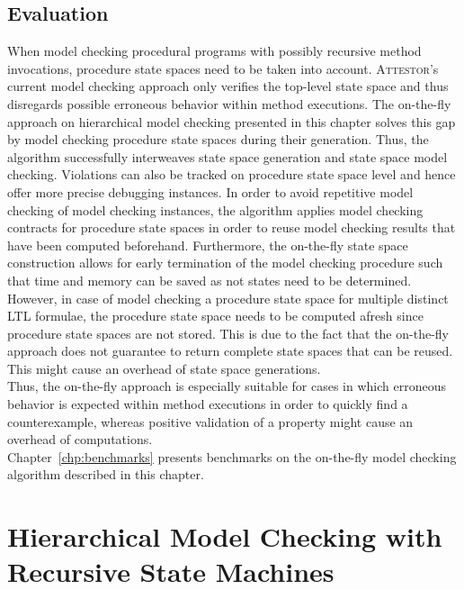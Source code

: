 \documentclass[a4paper, 12pt, twoside]{report}
\begin{document}
	
	\section{Evaluation}
	
	When model checking procedural programs with possibly recursive method invocations, procedure state spaces need to be taken into account. \textsc{Attestor}'s current model checking approach only verifies the top-level state space and thus disregards possible erroneous behavior within method executions. The on-the-fly approach on hierarchical model checking presented in this chapter solves this gap by model checking procedure state spaces during their generation. Thus, the algorithm successfully interweaves state space generation and state space model checking. Violations can also be tracked on procedure state space level and hence offer more precise debugging instances. In order to avoid repetitive model checking of model checking instances, the algorithm applies model checking contracts for procedure state spaces in order to reuse model checking results that have been computed beforehand. Furthermore, the on-the-fly state space construction allows for early termination of the model checking procedure such that time and memory can be saved as not states need to be determined. \\
	
	However, in case of model checking a procedure state space for multiple distinct LTL formulae, the procedure state space needs to be computed afresh since procedure state spaces are not stored. This is due to the fact that the on-the-fly approach does not guarantee to return complete state spaces that can be reused. This might cause an overhead of state space generations.\\
	
	Thus, the on-the-fly approach is especially suitable for cases in which erroneous behavior is expected within method executions in order to quickly find a counterexample, whereas positive validation of a property might cause an overhead of computations. \\
	
	Chapter~\ref{chp:benchmarks} presents benchmarks on the on-the-fly model checking algorithm described in this chapter.
		
	
	
	\chapter{Hierarchical Model Checking with Recursive State Machines}\label{chp:hmc}
\end{document}
